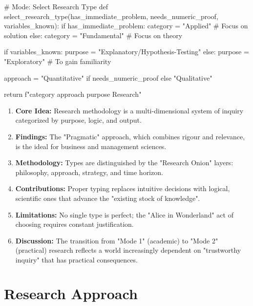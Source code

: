 \documentclass{report}
\begin{document}
\begin{}[python3]
    #  Mode: Select Research Type
    def select_research_type(has_immediate_problem, needs_numeric_proof, variables_known):
    if has_immediate_problem:
    category = "Applied" # Focus on solution
    else:
    category = "Fundamental" # Focus on theory
    
    if variables_known:
    purpose = "Explanatory/Hypothesis-Testing"
    else:
    purpose = "Exploratory" # To gain familiarity
    
    approach = "Quantitative" if needs_numeric_proof else "Qualitative"
    
    return f"{category} {approach} {purpose} Research"
\end{}

\begin{paper}
    \begin{enumerate}
        \item \textbf{Core Idea:} Research methodology is a multi-dimensional system of inquiry categorized by purpose, logic, and output.
        \item \textbf{Findings:} The "Pragmatic" approach, which combines rigour and relevance, is the ideal for business and management sciences.
        \item \textbf{Methodology:} Types are distinguished by the "Research Onion" layers: philosophy, approach, strategy, and time horizon.
        \item \textbf{Contributions:} Proper typing replaces intuitive decisions with logical, scientific ones that advance the "existing stock of knowledge".
        \item \textbf{Limitations:} No single type is perfect; the "Alice in Wonderland" act of choosing requires constant justification.
        \item \textbf{Discussion:} The transition from "Mode 1" (academic) to "Mode 2" (practical) research reflects a world increasingly dependent on "trustworthy inquiry" that has practical consequences.
    \end{enumerate}
\end{paper}


\section{Research Approach}
\end{document}
